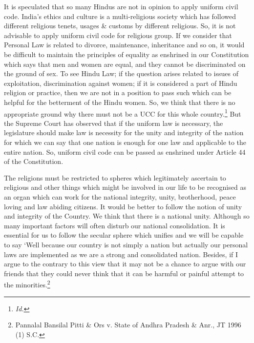 \begin{multicols}{2}
It is speculated that so many Hindus are not in opinion to apply uniform civil code. India’s
ethics and culture is a multi-religious society which has followed different religious tenets,
usages \& customs by different religious. So, it is not advisable to apply uniform civil code for
religious group. If we consider that Personal Law is related to divorce, maintenance,
inheritance and so on, it would be difficult to maintain the principles of equality as enshrined
in our Constitution which says that men and women are equal, and they cannot be
discriminated on the ground of sex. To see Hindu Law; if the question arises related to issues
of exploitation, discrimination against women; if it is considered a part of Hindu religion or
practice, then we are not in a position to pass such which can be helpful for the betterment of
the Hindu women. So, we think that there is no appropriate ground why there must not be a
UCC for this whole country.\footnote{\it Id.} But the Supreme Court has observed that if the uniform law is
necessary, the legislature should make law is necessity for the unity and integrity of the
nation for which we can say that one nation is enough for one law and applicable to the entire nation. So, uniform civil code can be passed as enshrined under Article 44 of the
Constitution. 

The religions must be restricted to spheres which legitimately ascertain to religious and other
things which might be involved in our life to be recognised as an organ which can work for
the national integrity, unity, brotherhood, peace loving and law abiding citizens. It would be
better to follow the notion of unity and integrity of the Country. We think that there is a
national unity. Although so many important factors will often disturb our national
consolidation. It is essential for us to follow the secular sphere which unifies and we will be
capable to say ‘Well because our country is not simply a nation but actually our personal laws
are implemented as we are a strong and consolidated nation. Besides, if I argue to the
contrary to this view that it may not be a chance to argue with our friends that they could
never think that it can be harmful or painful attempt to the minorities.\footnote{ Pannalal Bansilal Pitti \& Ors v. State of Andhra Pradesh \& Anr., JT 1996 (1) S.C.}


\end{multicols}
